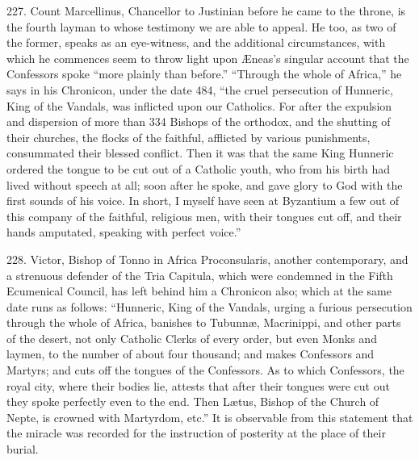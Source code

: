 227.
Count Marcellinus, Chancellor to Justinian before he came to the
throne, is the fourth layman to whose testimony we are able to appeal.
He too, as two of the former, speaks as an eye-witness, and the additional circumstances, with which he commences seem to throw light
upon Æneas's singular account that the Confessors spoke ``more plainly
than before.'' ``Through the whole of Africa,'' he says in his
Chronicon, under the date 484, ``the cruel persecution of Hunneric,
King of the Vandals, was inflicted upon our Catholics. For after the
expulsion and dispersion of more than 334 Bishops of the orthodox, and
the shutting of their churches, the flocks of the faithful, afflicted
by various punishments, consummated their blessed conflict. Then it
was that the same King Hunneric ordered the tongue to be cut out of a
Catholic youth, who from his birth had lived without speech at all;
soon after he spoke, and gave glory to God with the first sounds of
his voice. In short, I myself have seen at Byzantium a few out of this
company of the faithful, religious men, with their tongues cut off,
and their hands amputated, speaking with perfect voice.''

228.
Victor, Bishop of Tonno in Africa Proconsularis, another contemporary,
and a strenuous defender of the Tria Capitula, which were condemned in
the Fifth Ecumenical Council, has left behind him a Chronicon also;
which at the same date runs as follows: ``Hunneric, King of the
Vandals, urging a furious persecution through the whole of Africa,
banishes to Tubunnæ, Macrinippi, and other parts of the desert, not
only Catholic Clerks of every order, but even Monks and laymen,
to the number of about four thousand; and makes Confessors and
Martyrs; and cuts off the tongues of the Confessors. As to which
Confessors, the royal city, where their bodies lie, attests that after
their tongues were cut out they spoke perfectly even to the end. Then
Lætus, Bishop of the Church of Nepte, is crowned with Martyrdom, etc.''
It is observable from this statement that the miracle was recorded for
the instruction of posterity at the place of their burial.

